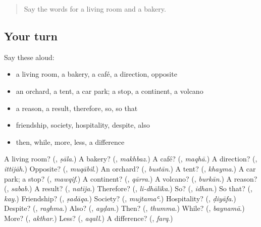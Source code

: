 \label{lesson:AR-R176-second-pass-words-from-chapters-172-176}



\begin{quote}
Say the words for a living room and a bakery.
\end{quote}

\subsection*{Your turn}
Say these aloud:

\begin{itemize}
\raggedright
  \item a living room, a bakery, a café, a direction, opposite
  \item an orchard, a tent, a car park; a stop, a continent, a volcano
  \item a reason, a result, therefore, so, so that
  \item friendship, society, hospitality, despite, also
  \item then, while, more, less, a difference
\end{itemize}

\begin{tcolorbox}[breakable,colback=teal!4,colframe=teal!35!black,title={Before you move on}]
A living room? (\textbf{}, \emph{ṣāla}.) A bakery? (\textbf{}, \emph{makhbaz}.) A café? (\textbf{}, \emph{maqhā}.) A direction? (\textbf{}, \emph{ittijāh}.) Opposite? (\textbf{}, \emph{muqābil}.) An orchard? (\textbf{}, \emph{bustān}.) A tent? (\textbf{}, \emph{khayma}.) A car park; a stop? (\textbf{}, \emph{mawqif}.) A continent? (\textbf{}, \emph{qārra}.) A volcano? (\textbf{}, \emph{burkān}.) A reason? (\textbf{}, \emph{sabab}.) A result? (\textbf{}, \emph{natīja}.) Therefore? (\textbf{}, \emph{li-dhālika}.) So? (\textbf{}, \emph{idhan}.) So that? (\textbf{}, \emph{kay}.) Friendship? (\textbf{}, \emph{ṣadāqa}.) Society? (\textbf{}, \emph{mujtamaʿ}.) Hospitality? (\textbf{}, \emph{ḍiyāfa}.) Despite? (\textbf{}, \emph{raghma}.) Also? (\textbf{}, \emph{ayḍan}.) Then? (\textbf{}, \emph{thumma}.) While? (\textbf{}, \emph{baynamā}.) More? (\textbf{}, \emph{akthar}.) Less? (\textbf{}, \emph{aqall}.) A difference? (\textbf{}, \emph{farq}.)
\end{tcolorbox}
